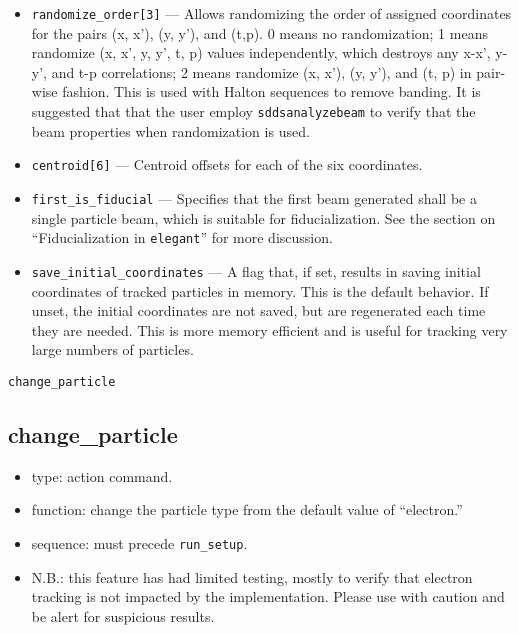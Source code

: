 \documentclass[11pt]{article}
\begin{document}
\begin{itemize}
\item \verb|randomize_order[3]| --- Allows randomizing the order of
assigned coordinates for the pairs (x, x'), (y, y'), and (t,p).  0
means no randomization; 1 means randomize (x, x', y, y', t, p) values
independently, which destroys any x-x', y-y', and t-p correlations; 2
means randomize (x, x'), (y, y'), and (t, p) in pair-wise fashion.
This is used with Halton sequences to remove banding.  It is suggested
that that the user employ \verb|sddsanalyzebeam| to verify that the
beam properties when randomization is used.

\item \verb|centroid[6]| --- Centroid offsets for each of the six coordinates.

\item \verb|first_is_fiducial| --- Specifies that the first beam
generated shall be a single particle beam, which is suitable for
fiducialization.  See the section on ``Fiducialization in
\verb|elegant|'' for more discussion.

\item \verb|save_initial_coordinates| --- A flag that, if set, results
in saving initial coordinates of tracked particles in memory.  This is
the default behavior.  If unset, the initial coordinates are not
saved, but are regenerated each time they are needed.  This is more
memory efficient and is useful for tracking very large numbers of
particles.
\end{itemize}

\newpage
\begin{center}{\Large\verb|change_particle|}\end{center}
\subsection{change\_particle\label{subsec:changeparticle}}

\begin{itemize}
\item type: action command.
\item function: change the particle type from the default value of ``electron.''
\item sequence: must precede \verb|run_setup|.
\item N.B.: this feature has had limited testing, mostly to verify that electron tracking is not
 impacted by the implementation.  Please use with caution and be alert for suspicious results.
\end{itemize}
\end{document}
